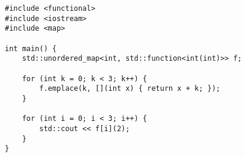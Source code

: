 \begin{lstlisting}[title=\href{https://godbolt.org/z/Ga1rTj}{\texttt{godbolt.org/z/Ga1rTj}}]
#include <functional>
#include <iostream>
#include <map>

int main() {
    std::unordered_map<int, std::function<int(int)>> f;
    
    for (int k = 0; k < 3; k++) {
        f.emplace(k, [](int x) { return x + k; });
    }

    for (int i = 0; i < 3; i++) {
        std::cout << f[i](2);
    }
}
\end{lstlisting}
